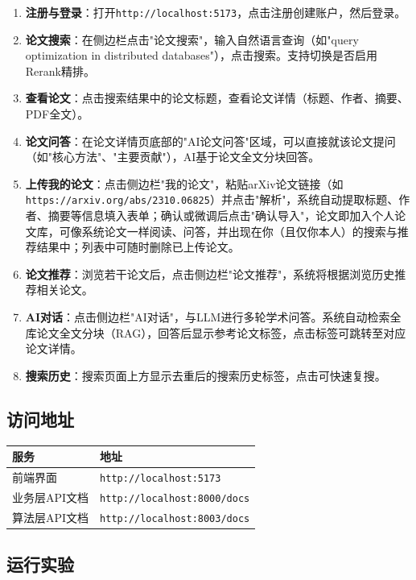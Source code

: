 \documentclass[12pt,a4paper]{ctexart}
\newcommand{\code}[1]{\texttt{#1}}
\begin{document}
\begin{enumerate}
\item \textbf{注册与登录}：打开\code{http://localhost:5173}，点击注册创建账户，然后登录。
\item \textbf{论文搜索}：在侧边栏点击"论文搜索"，输入自然语言查询（如"query optimization in distributed databases"），点击搜索。支持切换是否启用Rerank精排。
\item \textbf{查看论文}：点击搜索结果中的论文标题，查看论文详情（标题、作者、摘要、PDF全文）。
\item \textbf{论文问答}：在论文详情页底部的"AI论文问答"区域，可以直接就该论文提问（如"核心方法"、"主要贡献"），AI基于论文全文分块回答。
\item \textbf{上传我的论文}：点击侧边栏"我的论文"，粘贴arXiv论文链接（如\code{https://arxiv.org/abs/2310.06825}）并点击"解析"，系统自动提取标题、作者、摘要等信息填入表单；确认或微调后点击"确认导入"，论文即加入个人论文库，可像系统论文一样阅读、问答，并出现在你（且仅你本人）的搜索与推荐结果中；列表中可随时删除已上传论文。
\item \textbf{论文推荐}：浏览若干论文后，点击侧边栏"论文推荐"，系统将根据浏览历史推荐相关论文。
\item \textbf{AI对话}：点击侧边栏"AI对话"，与LLM进行多轮学术问答。系统自动检索全库论文全文分块（RAG），回答后显示参考论文标签，点击标签可跳转至对应论文详情。
\item \textbf{搜索历史}：搜索页面上方显示去重后的搜索历史标签，点击可快速复搜。
\end{enumerate}

\subsection{访问地址}

\begin{table}[H]
\centering
\begin{tabular}{ll}
\toprule
\textbf{服务} & \textbf{地址} \\
\midrule
前端界面        & \code{http://localhost:5173} \\
业务层API文档   & \code{http://localhost:8000/docs} \\
算法层API文档   & \code{http://localhost:8003/docs} \\
\bottomrule
\end{tabular}
\end{table}

\subsection{运行实验}
\end{document}
